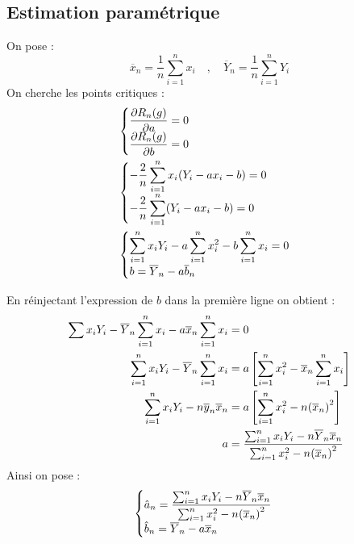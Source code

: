 \documentclass[12pt]{article}
\newcommand{\dps}{\displaystyle}
\newcommand{\parr}[1]{\hspace{-0.05cm}\left(#1 \right)}
\newcommand{\rect}[1]{\left[ #1 \right]}
\begin{document}
	\subsection{Estimation paramétrique}
	On pose : 
	\begin{equation*}
		\overline{x}_{n} = \frac{1}{n}\sum_{i=1}^{n}x_i\quad , \quad  \overline{Y}_{n} = \frac{1}{n}\sum_{i=1}^{n}Y_i
	\end{equation*}
	On cherche les points critiques : 
	\begin{align*}
		&\begin{cases}
			\dps 
			\frac{\partial R_{n}(g)}{\partial a} = 0
			\\
			\dps \frac{\partial R_{n}(g)}{\partial b} = 0
		\end{cases}
		\\
		&\begin{cases}
			\dps 
			-\frac{2}{n}\sum_{i=1}^{n}x_i \parr{Y_i - ax_i - b } = 0
			\\
			\dps -\frac{2}{n}\sum_{i=1}^{n}(Y_i - ax_i - b) = 0
		\end{cases}
		\\
		&\begin{cases}
			\dps 
			\sum_{i=1}^{n} x_i Y_i - a\sum_{i=1}^{n}x_i^{2} - b\sum_{i=1}^{n}x_i = 0
			\\
			\dps b = \overline{Y}_{n} - a\overline{b}_n
		\end{cases}
	\end{align*}
	
	En réinjectant l'expression de $b$ dans la première ligne on obtient :
	\begin{align*}
		\sum_{}^{}x_iY_i - \overline{Y}_n\sum_{i=1}^{n}x_i - a\overline{x}_n\sum_{i=1}^{n}x_i &= 0
		\\
		\sum_{i=1}^{n}x_i Y_i - \overline{Y}_{n} \sum_{i=1}^{n}x_i &= a \rect{ \sum_{i=1}^{n}x_i^{2} - \overline{x}_n \sum_{i=1}^{n}x_i }
		\\
		\sum_{i=1}^{n}x_i Y_i -n\overline{y}_n \overline{x}_n&= a \rect{\sum_{i=1}^{n}x_i^2 -n\parr{\overline{x}_n}^2} 
		\\
		a&=\dfrac{\sum_{i=1}^{n}x_i Y_i -n\overline{Y}_n \overline{x}_n}{\sum_{i=1}^{n}x_i^2 -n\parr{\overline{x}_n}^2}
	\end{align*}
Ainsi on pose :
\begin{equation*}
	\begin{cases}
		\hat{a}_{n}=\dfrac{\sum_{i=1}^{n}x_iY_i -n\overline{Y}_n \overline{x}_n}{\sum_{i=1}^{n}x_i^2 -n\parr{\overline{x}_n}^2}
		\\
		\hat{b}_{n}=\overline{Y}_n - a\overline{x}_{n}
	\end{cases}
\end{equation*}
\end{document}
